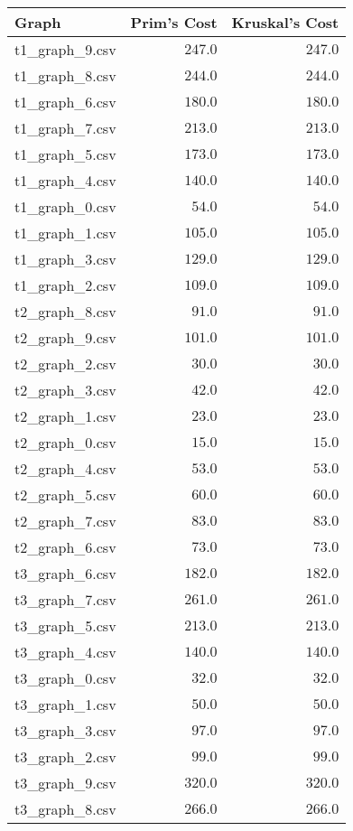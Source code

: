 \documentclass{article}
\begin{document}
\begin{tabular}{|l|r|r|}
\hline
\textbf{Graph} & \textbf{Prim's Cost} & \textbf{Kruskal's Cost} \\
\hline
t1\_graph\_9.csv & $247.0$ & $247.0$ \\
t1\_graph\_8.csv & $244.0$ & $244.0$ \\
t1\_graph\_6.csv & $180.0$ & $180.0$ \\
t1\_graph\_7.csv & $213.0$ & $213.0$ \\
t1\_graph\_5.csv & $173.0$ & $173.0$ \\
t1\_graph\_4.csv & $140.0$ & $140.0$ \\
t1\_graph\_0.csv & $54.0$ & $54.0$ \\
t1\_graph\_1.csv & $105.0$ & $105.0$ \\
t1\_graph\_3.csv & $129.0$ & $129.0$ \\
t1\_graph\_2.csv & $109.0$ & $109.0$ \\
t2\_graph\_8.csv & $91.0$ & $91.0$ \\
t2\_graph\_9.csv & $101.0$ & $101.0$ \\
t2\_graph\_2.csv & $30.0$ & $30.0$ \\
t2\_graph\_3.csv & $42.0$ & $42.0$ \\
t2\_graph\_1.csv & $23.0$ & $23.0$ \\
t2\_graph\_0.csv & $15.0$ & $15.0$ \\
t2\_graph\_4.csv & $53.0$ & $53.0$ \\
t2\_graph\_5.csv & $60.0$ & $60.0$ \\
t2\_graph\_7.csv & $83.0$ & $83.0$ \\
t2\_graph\_6.csv & $73.0$ & $73.0$ \\
t3\_graph\_6.csv & $182.0$ & $182.0$ \\
t3\_graph\_7.csv & $261.0$ & $261.0$ \\
t3\_graph\_5.csv & $213.0$ & $213.0$ \\
t3\_graph\_4.csv & $140.0$ & $140.0$ \\
t3\_graph\_0.csv & $32.0$ & $32.0$ \\
t3\_graph\_1.csv & $50.0$ & $50.0$ \\
t3\_graph\_3.csv & $97.0$ & $97.0$ \\
t3\_graph\_2.csv & $99.0$ & $99.0$ \\
t3\_graph\_9.csv & $320.0$ & $320.0$ \\
t3\_graph\_8.csv & $266.0$ & $266.0$ \\
\hline
\end{tabular}
\end{document}
